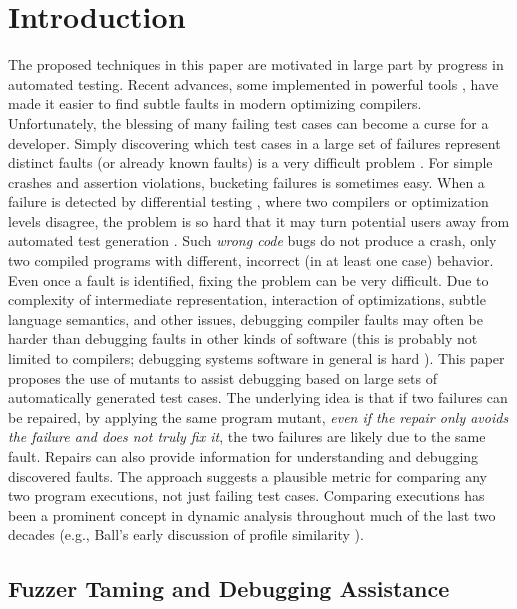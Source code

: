 \section{Introduction}

The proposed techniques in this paper are motivated in large part by progress in automated testing.  Recent advances, some implemented in powerful tools \cite{csmith,jsfunfuzz,ISSTA12,LangFuzz,ZhendongPLDI,ZhendongOOPSLA}, have made it easier to find subtle faults in modern optimizing compilers.  Unfortunately, the blessing of many failing test cases can become a curse for a developer.  Simply discovering which test cases in a large set of failures represent distinct faults (or already known faults) is a very difficult problem \cite{PLDI13,Podgurski04}.  For simple crashes and assertion violations, bucketing failures is sometimes easy.  When a failure is detected by differential testing \cite{Differential}, where two compilers or optimization levels disagree, the problem is so hard that it may turn potential users away from automated test generation \cite{PLDI13}.  Such \emph{wrong code} bugs do not produce a crash, only two compiled programs with different, incorrect (in at least one case) behavior.  Even once a fault is identified, fixing the problem can be very difficult.  Due to complexity of intermediate representation, interaction of optimizations, subtle language semantics, and other issues, debugging compiler faults may often be harder than debugging faults in other kinds of software (this is probably not limited to compilers; debugging systems software in general is hard \cite{mickens}).
This paper proposes the use of mutants \cite{mutant} to assist debugging based on large sets of automatically generated test cases.  The underlying idea is that if two failures can be repaired, by applying the same program mutant, \emph{even if the repair only avoids the failure and does not truly fix it}, the two failures are likely due to the same fault. Repairs can also provide  information for understanding and debugging discovered faults. The approach suggests a plausible metric for comparing any two program executions, not just failing test cases.  Comparing executions has been a prominent concept in dynamic analysis throughout much of the last two decades \cite{NearNeighbor,Sumner2011} (e.g., Ball's early discussion of profile similarity \cite{BallConcept}).

\subsection{Fuzzer Taming and Debugging Assistance}


